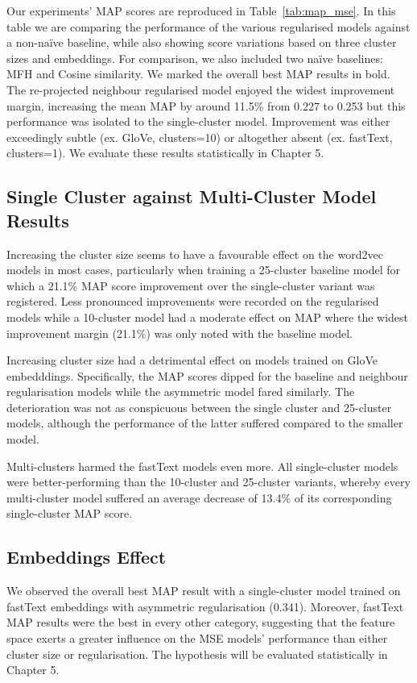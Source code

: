 Our experiments' \ac{MAP} scores are reproduced in Table~\ref{tab:map_mse}.  In this table we are comparing the performance of the various regularised models against a non-na\"ive baseline, while also showing score variations based on three cluster sizes and embeddings.  For comparison, we also included two na\"ive baselines: MFH and Cosine similarity.  We marked the overall best \ac{MAP} results in bold.  The re-projected neighbour regularised model enjoyed the widest improvement margin, increasing the mean \ac{MAP} by around 11.5\% from 0.227 to 0.253 but this performance was isolated to the single-cluster model.  Improvement was either exceedingly subtle (ex. GloVe, clusters=10) or altogether absent (ex. fastText, clusters=1).  We evaluate these results statistically in Chapter 5.

\subsection{Single Cluster against Multi-Cluster Model Results}
Increasing the cluster size seems to have a favourable effect on the word2vec models in most cases, particularly when training a 25-cluster baseline model for which a 21.1\% \ac{MAP} score improvement over the single-cluster variant was registered.  Less pronounced improvements were recorded on the regularised models while a 10-cluster model had a moderate effect on \ac{MAP} where the widest improvement margin (21.1\%) was only noted with the baseline model.  

Increasing cluster size had a detrimental effect on models trained on GloVe embedddings.  Specifically, the \ac{MAP} scores dipped for the baseline and neighbour regularisation models while the asymmetric model fared similarly.  The deterioration was not as conspicuous between the single cluster and 25-cluster models, although the performance of the latter suffered compared to the smaller model.  

Multi-clusters harmed the fastText models even more.  All single-cluster models were better-performing than the 10-cluster and 25-cluster variants, whereby every multi-cluster model suffered an average decrease of 13.4\% of its corresponding single-cluster \ac{MAP} score.  

\subsection{Embeddings Effect} \label{ustalov_embeddings}
We observed the overall best \ac{MAP} result with a single-cluster model trained on fastText embeddings with asymmetric regularisation (0.341).  Moreover, fastText \ac{MAP} results were the best in every other category, suggesting that the feature space exerts a greater influence on the \ac{MSE} models' performance than either cluster size or regularisation.  The hypothesis will be evaluated statistically in Chapter 5.

